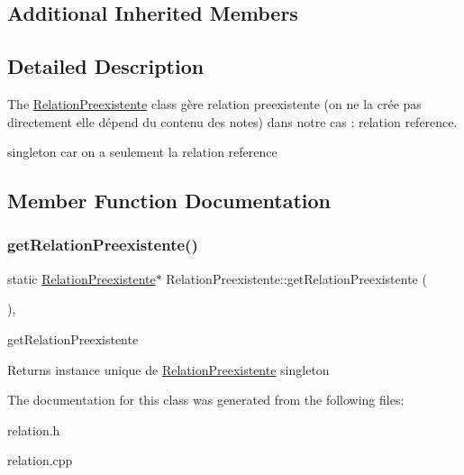 \subsection*{Additional Inherited Members}


\subsection{Detailed Description}
The \hyperlink{class_relation_preexistente}{Relation\+Preexistente} class gère relation preexistente (on ne la crée pas directement elle dépend du contenu des notes) dans notre cas \+: relation reference. 

singleton car on a seulement la relation reference 

\subsection{Member Function Documentation}
\mbox{\label{class_relation_preexistente_afd2c7ee8104d9dee00b52e5af1f5ed59}} 
\subsubsection{\texorpdfstring{get\+Relation\+Preexistente()}{getRelationPreexistente()}}
{\footnotesize\ttfamily static \hyperlink{class_relation_preexistente}{Relation\+Preexistente}$\ast$ Relation\+Preexistente\+::get\+Relation\+Preexistente (\begin{DoxyParamCaption}{ }\end{DoxyParamCaption})\hspace{0.3cm}{\ttfamily [inline]}, {\ttfamily [static]}}



get\+Relation\+Preexistente 

\begin{DoxyReturn}{Returns}
instance unique de \hyperlink{class_relation_preexistente}{Relation\+Preexistente} singleton 
\end{DoxyReturn}


The documentation for this class was generated from the following files\+:\begin{DoxyCompactItemize}
\item 
relation.\+h\item 
relation.\+cpp\end{DoxyCompactItemize}
